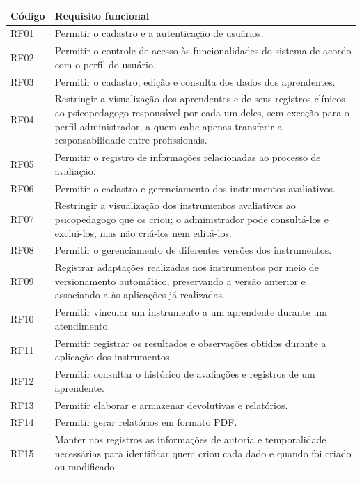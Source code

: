 \begin{quadro}[H]
\centering
\footnotesize
\caption{Requisitos funcionais}
\begin{tabular}{|p{1.6cm}|p{13cm}|}
\hline
\textbf{Código} & \textbf{Requisito funcional} \\
\hline
RF01 & Permitir o cadastro e a autenticação de usuários. \\ \hline
RF02 & Permitir o controle de acesso às funcionalidades do sistema de acordo com o perfil do usuário. \\ \hline
RF03 & Permitir o cadastro, edição e consulta dos dados dos aprendentes. \\ \hline
RF04 & Restringir a visualização dos aprendentes e de seus registros clínicos ao psicopedagogo responsável por cada um deles, sem exceção para o perfil administrador, a quem cabe apenas transferir a responsabilidade entre profissionais. \\ \hline
RF05 & Permitir o registro de informações relacionadas ao processo de avaliação. \\ \hline
RF06 & Permitir o cadastro e gerenciamento dos instrumentos avaliativos. \\ \hline
RF07 & Restringir a visualização dos instrumentos avaliativos ao psicopedagogo que os criou; o administrador pode consultá-los e excluí-los, mas não criá-los nem editá-los. \\ \hline
RF08 & Permitir o gerenciamento de diferentes versões dos instrumentos. \\ \hline
RF09 & Registrar adaptações realizadas nos instrumentos por meio de versionamento automático, preservando a versão anterior e associando-a às aplicações já realizadas. \\ \hline
RF10 & Permitir vincular um instrumento a um aprendente durante um atendimento. \\ \hline
RF11 & Permitir registrar os resultados e observações obtidos durante a aplicação dos instrumentos. \\ \hline
RF12 & Permitir consultar o histórico de avaliações e registros de um aprendente. \\ \hline
RF13 & Permitir elaborar e armazenar devolutivas e relatórios. \\ \hline
RF14 & Permitir gerar relatórios em formato PDF. \\ \hline
RF15 & Manter nos registros as informações de autoria e temporalidade necessárias para identificar quem criou cada dado e quando foi criado ou modificado. \\ \hline
\end{tabular}
\label{qua:requisitos_funcionais}
\end{quadro}


